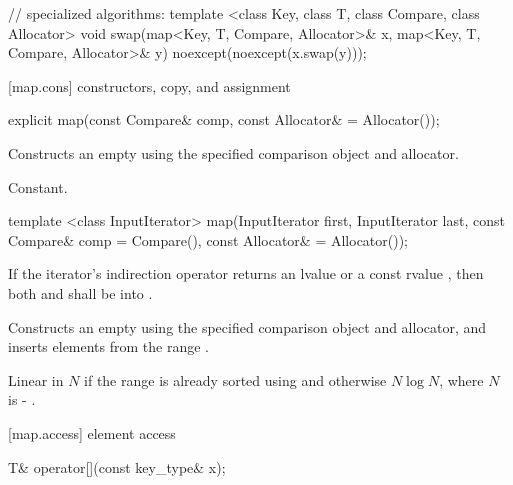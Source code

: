 \begin{codeblock}
{  // specialized algorithms:
  template <class Key, class T, class Compare, class Allocator>
    void swap(map<Key, T, Compare, Allocator>& x,
              map<Key, T, Compare, Allocator>& y)
      noexcept(noexcept(x.swap(y)));
}
\end{codeblock}


[map.cons]{ constructors, copy, and assignment}%
%

%
%
\begin{itemdecl}
explicit map(const Compare& comp, const Allocator& = Allocator());
\end{itemdecl}

\begin{itemdescr}
\pnum
\effects
Constructs an empty
using the specified comparison object and allocator.

\pnum
\complexity
Constant.
\end{itemdescr}

%
\begin{itemdecl}
template <class InputIterator>
  map(InputIterator first, InputIterator last,
      const Compare& comp = Compare(), const Allocator& = Allocator());
\end{itemdecl}

\begin{itemdescr}
\pnum
\requires If the iterator's indirection operator returns an lvalue or a
const rvalue , then both
 and  shall be
 into .

\pnum
\effects
Constructs an empty
using the specified comparison object and allocator,
and inserts elements from the range
.

\pnum
\complexity
Linear in $N$ if the range
is already sorted using 
and otherwise $N \log{N}$, where $N$
is  - .
\end{itemdescr}

[map.access]{ element access}

%
\begin{itemdecl}
T& operator[](const key_type& x);
\end{itemdecl}

